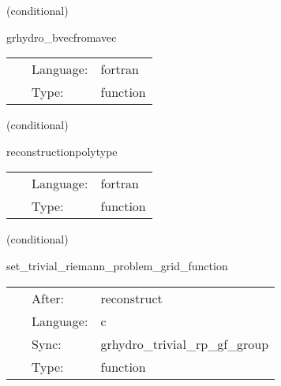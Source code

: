 \documentclass{article}
\begin{document}
\vspace{5mm}

   (conditional) 

\hspace{5mm} grhydro\_bvecfromavec 

\hspace{5mm}{\it populate bvec from avec } 


\hspace{5mm}

 \begin{tabular*}{160mm}{cll} 
~ & Language:  & fortran \\ 
~ & Type:  & function \\ 
\end{tabular*} 


\vspace{5mm}

   (conditional) 

\hspace{5mm} reconstructionpolytype 

\hspace{5mm}{\it reconstruct the functions at the cell boundaries } 


\hspace{5mm}

 \begin{tabular*}{160mm}{cll} 
~ & Language:  & fortran \\ 
~ & Type:  & function \\ 
\end{tabular*} 


\vspace{5mm}

   (conditional) 

\hspace{5mm} set\_trivial\_riemann\_problem\_grid\_function 

\hspace{5mm}{\it set the gridfunction for the trp (for debugging only) } 


\hspace{5mm}

 \begin{tabular*}{160mm}{cll} 
~ & After:  & reconstruct \\ 
~ & Language:  & c \\ 
~ & Sync:  & grhydro\_trivial\_rp\_gf\_group \\ 
~ & Type:  & function \\ 
\end{tabular*} 
\end{document}
